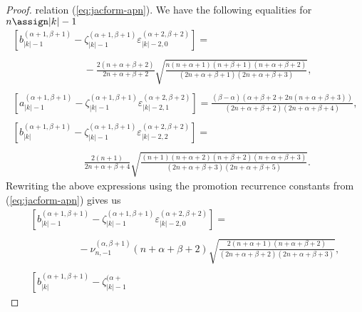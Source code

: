 \begin{proof}
  relation (\ref{eq:jacform-apn}). We have the following equalities for $n
  \assign |k| - 1$
  \[ \begin{array}{l}
       \left[ b_{|k| - 1}^{(\alpha + 1, \beta + 1)} - \zeta_{|k| - 1}^{(\alpha
       + 1, \beta + 1)} \varepsilon_{|k| - 2, 0}^{(\alpha + 2, \beta + 2)} 
       \right] =\\
       \\
       \hspace{3cm} - \frac{2 (n + \alpha + \beta + 2)}{2 n + \alpha + \beta +
       2} \sqrt{\frac{n (n + \alpha + 1) (n + \beta + 1) (n + \alpha + \beta +
       2)}{(2 n + \alpha + \beta + 1) (2 n + \alpha + \beta + 3)}},\\
       \\
       \left[ a_{|k| - 1}^{(\alpha + 1, \beta + 1)} - \zeta_{|k| - 1}^{(\alpha
       + 1, \beta + 1)} \varepsilon_{|k| - 2, 1}^{(\alpha + 2, \beta + 2)} 
       \right] = \frac{(\beta - \alpha) (\alpha + \beta + 2 + 2 n (n + \alpha
       + \beta + 3))}{(2 n + \alpha + \beta + 2) (2 n + \alpha + \beta +
       4)},\\
       \\
       \left[ b_{|k|}^{(\alpha + 1, \beta + 1)} - \zeta_{|k| - 1}^{(\alpha +
       1, \beta + 1)} \varepsilon_{|k| - 2, 2}^{(\alpha + 2, \beta + 2)} 
       \right] =\\
       \\
       \hspace{3cm} \frac{2 (n + 1)}{2 n + \alpha + \beta + 4} \sqrt{\frac{(n
       + 1) (n + \alpha + 2) (n + \beta + 2) (n + \alpha + \beta + 3)}{(2 n +
       \alpha + \beta + 3) (2 n + \alpha + \beta + 5)}} .
     \end{array} \]
  Rewriting the above expressions using the promotion recurrence constants
  from (\ref{eq:jacform-apn}) gives us
  \[ \begin{array}{l}
       \left[ b_{|k| - 1}^{(\alpha + 1, \beta + 1)} - \zeta_{|k| - 1}^{(\alpha
       + 1, \beta + 1)} \varepsilon_{|k| - 2, 0}^{(\alpha + 2, \beta + 2)} 
       \right] =\\
       \\
       \hspace{2cm} - \nu_{n, - 1}^{(\alpha, \beta + 1)} (n + \alpha + \beta +
       2) \sqrt{\frac{2 (n + \alpha + 1) (n + \alpha + \beta + 2)}{(2 n +
       \alpha + \beta + 2) (2 n + \alpha + \beta + 3)}},\\
       \\
       \left[ b_{|k|}^{(\alpha + 1, \beta + 1)} - \zeta_{|k| - 1}^{(\alpha +
}
\end{array}\]
\end{proof}
